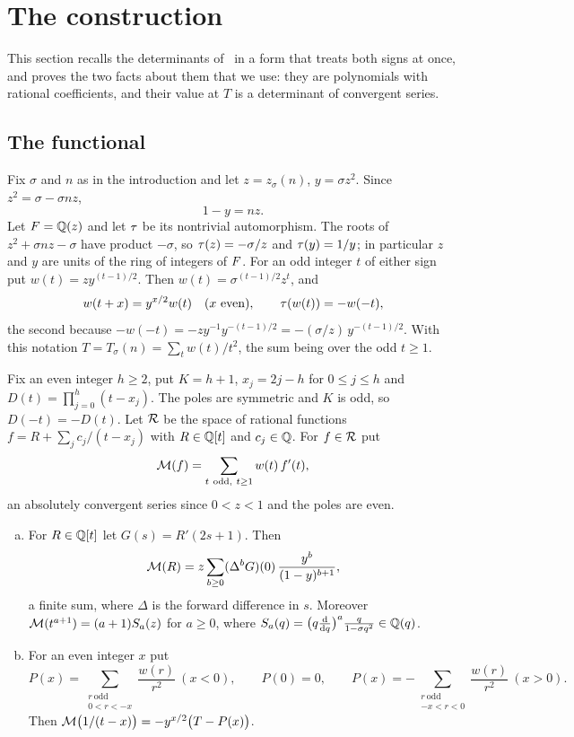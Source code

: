 \section{The construction}\label{sec:pencil}

This section recalls the determinants of~\Kri{} in a form that treats both signs at once, and
proves the two facts about them that we use: they are polynomials with rational coefficients,
and their value at $T$ is a determinant of convergent series.

\subsection{The functional}\label{subsec:functional}

Fix $\sigma$ and $n$ as in the introduction and let $z=z_\sigma(n)$, $y=\sigma z^2$. Since
$z^2=\sigma-\sigma nz$,
\begin{equation}\label{eq:one-minus-y}
1-y=nz .
\end{equation}
Let $F=\mathbb{Q}(z)$ and let $\tau$ be its nontrivial automorphism. The roots of $z^2+\sigma nz-\sigma$
have product $-\sigma$, so $\tau(z)=-\sigma/z$ and $\tau(y)=1/y$; in particular $z$ and $y$
are units of the ring of integers of $F$. For an odd integer $t$ of either sign put
$w(t)=zy^{(t-1)/2}$. Then $w(t)=\sigma^{(t-1)/2}z^t$, and
\begin{equation}\label{eq:weight-rules}
w(t+x)=y^{x/2}w(t)\quad(x\text{ even}),\qquad \tau(w(t))=-w(-t),
\end{equation}
the second because $-w(-t)=-zy^{-1}y^{-(t-1)/2}=-(\sigma/z)\,y^{-(t-1)/2}$. With this notation
$T=T_\sigma(n)=\sum_{t}w(t)/t^2$, the sum being over the odd $t\ge1$.

Fix an even integer $h\ge2$, put $K=h+1$, $x_j=2j-h$ for $0\le j\le h$ and
$D(t)=\prod_{j=0}^{h}(t-x_j)$. The poles are symmetric and $K$ is odd, so $D(-t)=-D(t)$. Let
$\mathcal{R}$ be the space of rational functions $f=R+\sum_jc_j/(t-x_j)$ with $R\in\mathbb{Q}[t]$ and
$c_j\in\mathbb{Q}$. For $f\in\mathcal{R}$ put
\[
\Mf(f)=\sum_{t\ \mathrm{odd},\ t\ge1}w(t)\,f'(t),
\]
an absolutely convergent series since $0<z<1$ and the poles are even.

\begin{lemma}\label{lem:evaluation}
\begin{enumerate}[(a)]
\item For $R\in\mathbb{Q}[t]$ let $G(s)=R'(2s+1)$. Then
\begin{equation}\label{eq:mahler}
\mathcal{M}(R)=z\sum_{b\ge0}(\Delta^bG)(0)\,\frac{y^b}{(1-y)^{b+1}},
\end{equation}
a finite sum, where $\Delta$ is the forward difference in $s$. Moreover
$\mathcal{M}(t^{a+1})=(a+1)S_a(z)$ for $a\ge0$, where
$S_a(q)=\bigl(q\frac{\mathrm d}{\mathrm dq}\bigr)^a\frac{q}{1-\sigma q^2}\in\mathbb{Q}(q)$.
\item For an even integer $x$ put
\[
P(x)=\sum_{\substack{r\ \mathrm{odd}\\0<r<-x}}\frac{w(r)}{r^2}\ (x<0),\qquad P(0)=0,\qquad
P(x)=-\sum_{\substack{r\ \mathrm{odd}\\-x<r<0}}\frac{w(r)}{r^2}\ (x>0).
\]
Then $\mathcal{M}\bigl(1/(t-x)\bigr)=-y^{x/2}\bigl(T-P(x)\bigr)$.
\end{enumerate}
\end{lemma}

